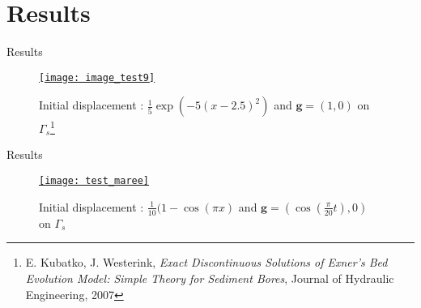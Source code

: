 \section{Results}

\begin{frame}{Results}
\begin{figure}
\href{run:animation_test9.ogv}{\texttt{[image: image\_test9]}} 
\caption{Initial displacement : $\frac{1}{5}\exp(-5(x-2.5)^2)$ and $\mathbf{g}=(1, 0)$ on $\Gamma_{s}$\footnote{E. Kubatko, J. Westerink, \textit{Exact Discontinuous Solutions of Exner's Bed Evolution Model: Simple Theory for Sediment Bores}, Journal of Hydraulic Engineering, 2007}}
\end{figure}
\end{frame}

\begin{frame}{Results}
\begin{figure}
\href{run:animation_maree.ogv}{\texttt{[image: test\_maree]}} 
\caption{Initial displacement : $\frac{1}{10}(1-\cos(\pi x)$ and $\mathbf{g}=(\cos(\frac{\pi}{20}t), 0)$ on $\Gamma_{s}$}
\end{figure}
\end{frame}

